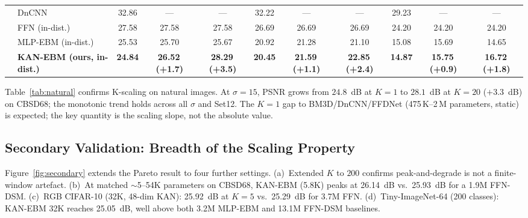 \documentclass{article}
\begin{document}
\begin{table}[t]
{\begin{tabular}{llccccccccc}
  & DnCNN \citep{zhang2017}  & 32.86 & ---   & ---   & 32.22 & ---   & ---   & 29.23 & ---   & ---   \\
\cmidrule{2-11}
  & FFN (in-dist.)           & 27.58 & 27.58 & 27.58 & 26.69 & 26.69 & 26.69 & 24.20 & 24.20 & 24.20 \\
  & MLP-EBM (in-dist.)       & 25.53 & 25.70 & 25.67 & 20.92 & 21.28 & 21.10 & 15.08 & 15.69 & 14.65 \\
  & \textbf{KAN-EBM (ours, in-dist.)} & \textbf{24.84} & \textbf{26.52\,(+1.7)} & \textbf{28.29\,(+3.5)} & \textbf{20.45} & \textbf{21.59\,(+1.1)} & \textbf{22.85\,(+2.4)} & \textbf{14.87} & \textbf{15.75\,(+0.9)} & \textbf{16.72\,(+1.8)} \\
\bottomrule
\end{tabular}}
\end{table}

Table~\ref{tab:natural} confirms K-scaling on natural images. At $\sigma{=}15$,
PSNR grows from $24.8$~dB at $K{=}1$ to $28.1$~dB at $K{=}20$ ($+3.3$~dB) on
CBSD68; the monotonic trend holds across all $\sigma$ and Set12. The $K{=}1$ gap to
BM3D/DnCNN/FFDNet (475\,K--2\,M parameters, static) is expected; the key quantity is
the scaling slope, not the absolute value.

\subsection{Secondary Validation: Breadth of the Scaling Property}
\label{sec:secondary}
\label{sec:multitask}

Figure~\ref{fig:secondary} extends the Pareto result to four further settings.
(a)~Extended $K$ to $200$ confirms peak-and-degrade is not a finite-window artefact.
(b)~At matched ${\sim}$5--54K parameters on CBSD68, KAN-EBM (5.8K) peaks at
26.14~dB vs.\ 25.93~dB for a 1.9M FFN-DSM.
(c)~RGB CIFAR-10 (32K, 48-dim KAN): 25.92~dB at $K{=}5$ vs.\ 25.29~dB for 3.7M FFN.
(d)~Tiny-ImageNet-64 (200 classes): KAN-EBM 32K reaches 25.05~dB, well above both
3.2M MLP-EBM and 13.1M FFN-DSM baselines.
\end{document}
